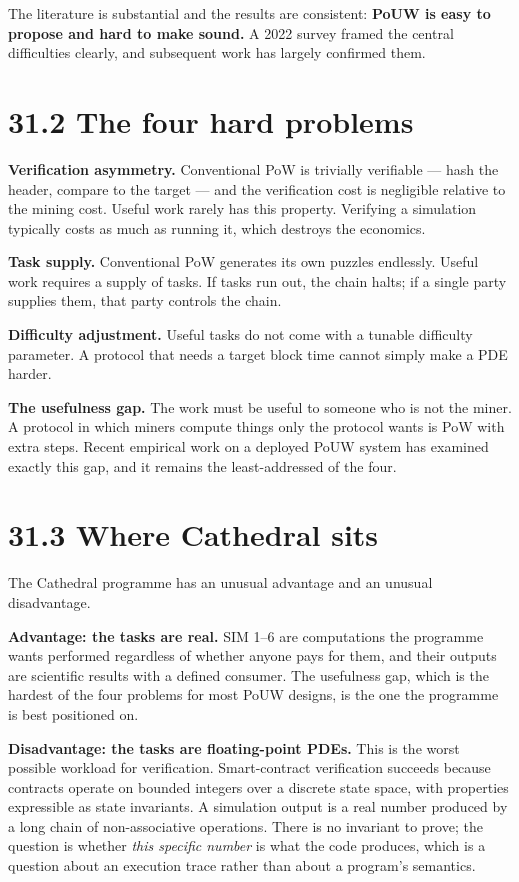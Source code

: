 \documentclass[
  11pt]{report}
\begin{document}
The literature is substantial and the results are consistent:
\textbf{PoUW is easy to propose and hard to make sound.} A 2022 survey
framed the central difficulties clearly, and subsequent work has largely
confirmed them.

\hypertarget{the-four-hard-problems}{%
\section{31.2 The four hard problems}\label{the-four-hard-problems}}

\textbf{Verification asymmetry.} Conventional PoW is trivially
verifiable --- hash the header, compare to the target --- and the
verification cost is negligible relative to the mining cost. Useful work
rarely has this property. Verifying a simulation typically costs as much
as running it, which destroys the economics.

\textbf{Task supply.} Conventional PoW generates its own puzzles
endlessly. Useful work requires a supply of tasks. If tasks run out, the
chain halts; if a single party supplies them, that party controls the
chain.

\textbf{Difficulty adjustment.} Useful tasks do not come with a tunable
difficulty parameter. A protocol that needs a target block time cannot
simply make a PDE harder.

\textbf{The usefulness gap.} The work must be useful to someone who is
not the miner. A protocol in which miners compute things only the
protocol wants is PoW with extra steps. Recent empirical work on a
deployed PoUW system has examined exactly this gap, and it remains the
least-addressed of the four.

\hypertarget{where-cathedral-sits}{%
\section{31.3 Where Cathedral sits}\label{where-cathedral-sits}}

The Cathedral programme has an unusual advantage and an unusual
disadvantage.

\textbf{Advantage: the tasks are real.} SIM 1--6 are computations the
programme wants performed regardless of whether anyone pays for them,
and their outputs are scientific results with a defined consumer. The
usefulness gap, which is the hardest of the four problems for most PoUW
designs, is the one the programme is best positioned on.

\textbf{Disadvantage: the tasks are floating-point PDEs.} This is the
worst possible workload for verification. Smart-contract verification
succeeds because contracts operate on bounded integers over a discrete
state space, with properties expressible as state invariants. A
simulation output is a real number produced by a long chain of
non-associative operations. There is no invariant to prove; the question
is whether \emph{this specific number} is what the code produces, which
is a question about an execution trace rather than about a program's
semantics.
\end{document}
